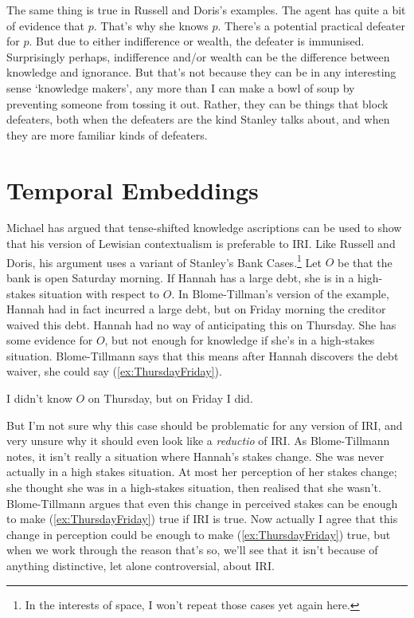 \documentclass[oneside]{book}
\renewcommand{\numbex}[2]{
\begin{enumerate*}
\setcounter{enumi}{\value{paper}}
\renewcommand{\labelenumi}{(\arabic{enumi})}
#2
\end{enumerate*}
\addtocounter{paper}{#1}}
\begin{document}
The same thing is true in Russell and Doris's examples. The agent has quite a bit of evidence that \(p\). That's why she knows \(p\). There's a potential practical defeater for \(p\). But due to either indifference or wealth, the defeater is immunised. Surprisingly perhaps, indifference and/or wealth can be the difference between knowledge and ignorance. But that's not because they can be in any interesting sense `knowledge makers', any more than I can make a bowl of soup by preventing someone from tossing it out. Rather, they can be things that block defeaters, both when the defeaters are the kind Stanley talks about, and when they are more familiar kinds of defeaters.

\section{Temporal Embeddings} \label{sect:time}

Michael \cite{MBT2009} has argued that tense-shifted knowledge ascriptions can be used to show that his version of Lewisian contextualism is preferable to IRI. Like Russell and Doris, his argument uses a variant of Stanley's Bank Cases.\footnote{In the interests of space, I won't repeat those cases yet again here.} Let \(O\) be that the bank is open Saturday morning. If Hannah has a large debt, she is in a high-stakes situation with respect to \(O\). In Blome-Tillman's version of the example, Hannah had in fact incurred a large debt, but on Friday morning the creditor waived this debt. Hannah had no way of anticipating this on Thursday. She has some evidence for \(O\), but not enough for knowledge if she's in a high-stakes situation. Blome-Tillmann says that this means after Hannah discovers the debt waiver, she could say (\ref{ex:ThursdayFriday}).

\numbex{1}{
\item \label{ex:ThursdayFriday} I didn't know \(O\) on Thursday, but on Friday I did.
}

\noindent But I'm not sure why this case should be problematic for any version of IRI, and very unsure why it should even look like a \textit{reductio} of IRI. As Blome-Tillmann notes, it isn't really a situation where Hannah's stakes change. She was never actually in a high stakes situation. At most her perception of her stakes change; she thought she was in a high-stakes situation, then realised that she wasn't. Blome-Tillmann argues that even this change in perceived stakes can be enough to make (\ref{ex:ThursdayFriday}) true if IRI is true. Now actually I agree that this change in perception could be enough to make (\ref{ex:ThursdayFriday}) true, but when we work through the reason that's so, we'll see that it isn't because of anything distinctive, let alone controversial, about IRI.
\end{document}
